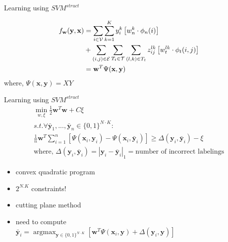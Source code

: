 \documentclass{beamer}
\DeclareMathOperator*{\argmax}{argmax}
\newcommand{\n}{{n}}             %
\newcommand{\x}{{\mathbf x}}     %
\newcommand{\y}{{\mathbf y}}     %
\newcommand{\ysc}[2]{{y_{#1}^{#2}}}    %
\newcommand{\zsc}[2]{{z_{#1}^{#2}}}    %
\newcommand{\fn}[1]{{\phi_n(#1)}}      %
\newcommand{\fe}[3]{{\phi_{#1}(#2,#3)}}%
\newcommand{\w}{{\mathbf w}}           %
\newcommand{\wn}[1]{{w_n^{#1}}}        %
\newcommand{\we}[3]{{w_{#1}^{#2#3}}}   %
\newcommand{\df}[3]{{f_{#3}(#1,#2)}}   %
\newcommand{\loss}[2]{{\Delta(#1,#2)}}   %
\begin{document}
\begin{frame}{Learning using $SVM^{struct}$}

\begin{equation} \label{eq:model}
\begin{split}
\df{\y}{\x}{\w} & = \sum_{i \in \mathcal{V}} \sum_{k=1}^{K} \ysc{i}{k} \left[\wn{k} \cdot \fn{i} \right] \\
 & + \sum_{(i,j)\in \mathcal{E}}   \sum_{T_t \in {\cal T}}  \sum_{(l,k)\in T_t} \zsc{ij}{lk}   \left[\we{t}{l}{k} \cdot \fe{t}{i}{j}\right] \\
& = \w^T \Psi(\x,\y)
 \end{split}
\end{equation}
where, $\Psi(\x,\y)=XY$

\end{frame}

\begin{frame}{Learning using $SVM^{struct}$}
\begin{eqnarray*} \label{eq:trainqp}
\min_{w,\xi}    \frac{1}{2} \w^T\w + C\xi\\
s.t.   \forall \bar{\y}_1,...,\bar{\y}_\n \in \{0,1\}^{N \cdot K} :\\
 \frac{1}{n} \w^T \sum_{i=1}^{n} [\Psi( \x_i, \y_i) \nonumber - \Psi(\x_i,\bar{\y}_i)] \ge \Delta(\y_i,\bar{\y}_i) -\xi \nonumber \\
\text{where, } \Delta(\y_i,\bar{\y}_i)=|\y_i-\bar{\y}_i|_1=\text{number of incorrect labelings}
\end{eqnarray*}

\begin{itemize}
\item convex quadratic program
\item $2^{N.K}$ constraints!
\item cutting plane method
\item need to compute \\ $\bar{\y}_i  = \argmax_{\y \in \{0,1\}^{N \cdot K}} \left[ \w^T \Psi(\x_i,\y) + \loss{\y_i}{\y} \right]$
\end{itemize}
\end{frame}
\end{document}
